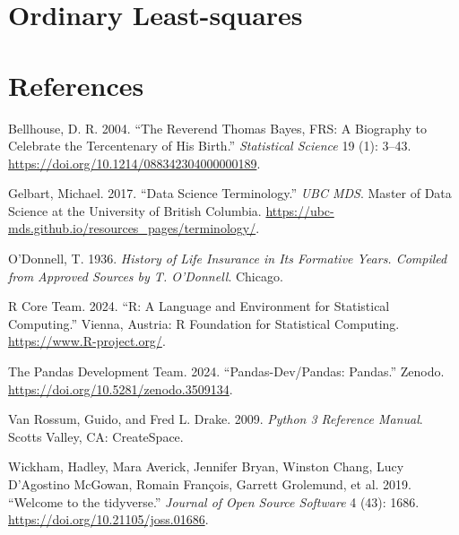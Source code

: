 \documentclass[
  letterpaper,
  DIV=11,
  numbers=noendperiod]{scrreprt}
\newlength{\cslhangindent}
\newenvironment{CSLReferences}[2] %
 {\begin{list}{}{%
  \setlength{\itemindent}{0pt}
  \setlength{\leftmargin}{0pt}
  \setlength{\parsep}{0pt}
  \ifodd #1
   \setlength{\leftmargin}{\cslhangindent}
   \setlength{\itemindent}{-1\cslhangindent}
  \fi
  \setlength{\itemsep}{#2\baselineskip}}}
 {\end{list}}
\begin{document}

\chapter{Ordinary Least-squares}\label{sec-ols}


\chapter*{References}\label{references}


\label{refs}
\begin{CSLReferences}{1}{0}
Bellhouse, D. R. 2004. {``{The Reverend Thomas Bayes, FRS: A Biography
to Celebrate the Tercentenary of His Birth}.''} \emph{Statistical
Science} 19 (1): 3--43.
\url{https://doi.org/10.1214/088342304000000189}.

Gelbart, Michael. 2017. {``Data Science Terminology.''} \emph{UBC MDS}.
Master of Data Science at the University of British Columbia.
\url{https://ubc-mds.github.io/resources_pages/terminology/}.

O'Donnell, T. 1936. \emph{{History of Life Insurance in Its Formative
Years. Compiled from Approved Sources by T. O'Donnell}}. Chicago.

R Core Team. 2024. {``R: A Language and Environment for Statistical
Computing.''} Vienna, Austria: R Foundation for Statistical Computing.
\url{https://www.R-project.org/}.

The Pandas Development Team. 2024. {``Pandas-Dev/Pandas: Pandas.''}
Zenodo. \url{https://doi.org/10.5281/zenodo.3509134}.

Van Rossum, Guido, and Fred L. Drake. 2009. \emph{Python 3 Reference
Manual}. Scotts Valley, CA: CreateSpace.

Wickham, Hadley, Mara Averick, Jennifer Bryan, Winston Chang, Lucy
D'Agostino McGowan, Romain François, Garrett Grolemund, et al. 2019.
{``Welcome to the {tidyverse}.''} \emph{Journal of Open Source Software}
4 (43): 1686. \url{https://doi.org/10.21105/joss.01686}.

\end{CSLReferences}
\end{document}
